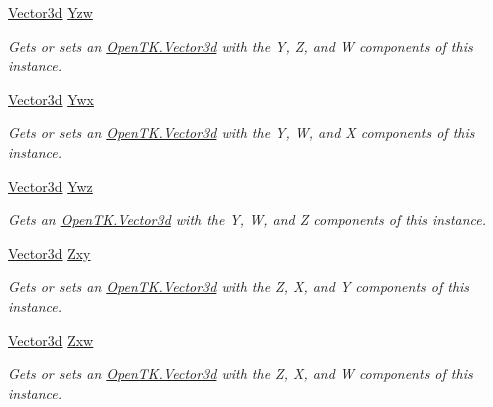 \begin{DoxyCompactItemize}
\hyperlink{struct_open_t_k_1_1_vector3d}{Vector3d} \hyperlink{struct_open_t_k_1_1_vector4d_aa26f2964b337aa6fb8b3cd76c7f228be}{Yzw}
\begin{DoxyCompactList}\small\item\em Gets or sets an \hyperlink{struct_open_t_k_1_1_vector3d}{Open\-T\-K.\-Vector3d} with the Y, Z, and W components of this instance. \end{DoxyCompactList}\item 
\hyperlink{struct_open_t_k_1_1_vector3d}{Vector3d} \hyperlink{struct_open_t_k_1_1_vector4d_a38f8506812c576ba282db5354f07fbd0}{Ywx}
\begin{DoxyCompactList}\small\item\em Gets or sets an \hyperlink{struct_open_t_k_1_1_vector3d}{Open\-T\-K.\-Vector3d} with the Y, W, and X components of this instance. \end{DoxyCompactList}\item 
\hyperlink{struct_open_t_k_1_1_vector3d}{Vector3d} \hyperlink{struct_open_t_k_1_1_vector4d_af37c99e4b4ea8c9d6592af05c4375d74}{Ywz}
\begin{DoxyCompactList}\small\item\em Gets an \hyperlink{struct_open_t_k_1_1_vector3d}{Open\-T\-K.\-Vector3d} with the Y, W, and Z components of this instance. \end{DoxyCompactList}\item 
\hyperlink{struct_open_t_k_1_1_vector3d}{Vector3d} \hyperlink{struct_open_t_k_1_1_vector4d_a6073000686398b5e623109eff3c96719}{Zxy}
\begin{DoxyCompactList}\small\item\em Gets or sets an \hyperlink{struct_open_t_k_1_1_vector3d}{Open\-T\-K.\-Vector3d} with the Z, X, and Y components of this instance. \end{DoxyCompactList}\item 
\hyperlink{struct_open_t_k_1_1_vector3d}{Vector3d} \hyperlink{struct_open_t_k_1_1_vector4d_a1d73a5b92928bd51e510dd55d81577f2}{Zxw}
\begin{DoxyCompactList}\small\item\em Gets or sets an \hyperlink{struct_open_t_k_1_1_vector3d}{Open\-T\-K.\-Vector3d} with the Z, X, and W components of this instance. \end{DoxyCompactList}\item 

\end{DoxyCompactItemize}

